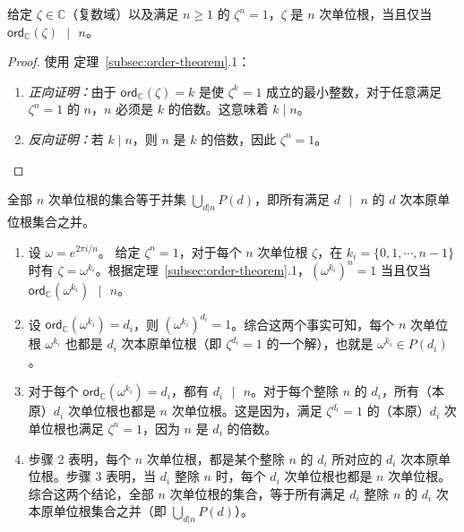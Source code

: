 \begin{tcolorbox}[title={\textbf{\tboxtheorem{\ref*{subsec:roots-theorem}.2} 单位根的阶}}]
给定 $\zeta \in \mathbb{C}$（复数域）以及满足 $n \geq 1$ 的 $\zeta^n = 1$，$\zeta$ 是 $n$ 次单位根，当且仅当 $\textsf{ord}_{\mathbb{C}}(\zeta) \text{ } | \text{ } n$。
\end{tcolorbox}
\begin{proof}
    使用
    定理~\ref*{subsec:order-theorem}.1：
    \begin{enumerate}
    \item \textit{正向证明：}由于 $\textsf{ord}_{\mathbb{C}}(\zeta)=k$ 是使 $\zeta^k = 1$ 成立的最小整数，对于任意满足 $\zeta^n = 1$ 的 $n$，$n$ 必须是 $k$ 的倍数。这意味着 $k \mid n$。
    \item \textit{反向证明：}若 $k \mid n$，则 $n$ 是 $k$ 的倍数，因此 $\zeta^n = 1$。
    \end{enumerate}
\end{proof}

\begin{tcolorbox}[title={\textbf{\tboxtheorem{\ref*{subsec:roots-theorem}.3} 全部 $\bm{n}$ 次单位根的集合}}]
全部 $n$ 次单位根的集合等于并集 $\bigcup_{d|n} P(d)$，即所有满足 $d \text{ } | \text{ } n$ 的 $d$ 次本原单位根集合之并。
\end{tcolorbox}
\begin{myproof}
    \begin{enumerate}
    \item 设 $\omega = e^{2\pi i/n}$。
    给定 $\zeta^n = 1$，对于每个 $n$ 次单位根 $\zeta$，在 $k_i = \{0, 1, \cdots, n-1\}$ 时有 $\zeta = \omega^{k_i}$。根据定理~\ref*{subsec:order-theorem}.1，$(\omega^{k_i})^n = 1$ 当且仅当 $\textsf{ord}_{\mathbb{C}}(\omega^{k_i}) \text{ } | \text{ } n$。
    \item 设 $\textsf{ord}_{\mathbb{C}}(\omega^{k_i}) = d_i$，则 $(\omega^{k_i})^{d_i} = 1$。综合这两个事实可知，每个 $n$ 次单位根 $\omega^{k_i}$ 也都是 $d_i$ 次本原单位根（即 $\zeta^{d_i} = 1$ 的一个解），也就是 $\omega^{k_i} \in P(d_i)$。
    \item 对于每个 $\textsf{ord}_{\mathbb{C}}(\omega^{k_i}) = d_i$，都有 $d_i \text{ } | \text{ } n$。对于每个整除 $n$ 的 $d_i$，所有（本原）$d_i$ 次单位根也都是 $n$ 次单位根。这是因为，满足 $\zeta^{d_i} = 1$ 的（本原）$d_i$ 次单位根也满足 $\zeta^{n} = 1$，因为 $n$ 是 $d_i$ 的倍数。
    \item 步骤 2 表明，每个 $n$ 次单位根，都是某个整除 $n$ 的 $d_i$ 所对应的 $d_i$ 次本原单位根。步骤 3 表明，当 $d_i$ 整除 $n$ 时，每个 $d_i$ 次单位根也都是 $n$ 次单位根。综合这两个结论，全部 $n$ 次单位根的集合，等于所有满足 $d_i$ 整除 $n$ 的 $d_i$ 次本原单位根集合之并（即 $\bigcup_{d|n} P(d)$）。
    \end{enumerate}
\end{myproof}

